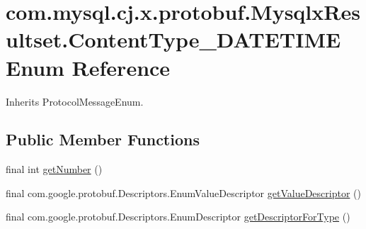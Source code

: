 \hypertarget{enumcom_1_1mysql_1_1cj_1_1x_1_1protobuf_1_1_mysqlx_resultset_1_1_content_type___d_a_t_e_t_i_m_e}{}\section{com.\+mysql.\+cj.\+x.\+protobuf.\+Mysqlx\+Resultset.\+Content\+Type\+\_\+\+D\+A\+T\+E\+T\+I\+ME Enum Reference}
\label{enumcom_1_1mysql_1_1cj_1_1x_1_1protobuf_1_1_mysqlx_resultset_1_1_content_type___d_a_t_e_t_i_m_e}


Inherits Protocol\+Message\+Enum.

\subsection*{Public Member Functions}
\begin{DoxyCompactItemize}
\item 
final int \mbox{\hyperlink{enumcom_1_1mysql_1_1cj_1_1x_1_1protobuf_1_1_mysqlx_resultset_1_1_content_type___d_a_t_e_t_i_m_e_afc882c66b1e58a281a43c1bb674930f5}{get\+Number}} ()
\item 
final com.\+google.\+protobuf.\+Descriptors.\+Enum\+Value\+Descriptor \mbox{\hyperlink{enumcom_1_1mysql_1_1cj_1_1x_1_1protobuf_1_1_mysqlx_resultset_1_1_content_type___d_a_t_e_t_i_m_e_a77ed4a2bbacc0713316d126b635426f4}{get\+Value\+Descriptor}} ()
\item 
final com.\+google.\+protobuf.\+Descriptors.\+Enum\+Descriptor \mbox{\hyperlink{enumcom_1_1mysql_1_1cj_1_1x_1_1protobuf_1_1_mysqlx_resultset_1_1_content_type___d_a_t_e_t_i_m_e_abfe5181789aa2c8b6d8cffde9d02e82b}{get\+Descriptor\+For\+Type}} ()
\end{DoxyCompactItemize}
